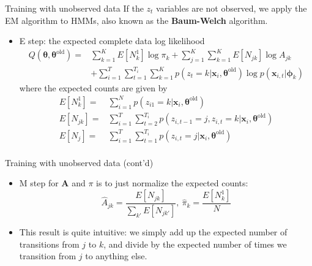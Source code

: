 \documentclass[10pt,mathserif]{beamer}
\begin{document}
\begin{frame}{Training with unobserved data}
If the $z_t$ variables are not observed, we apply the EM algorithm to HMMs, also known as the \textbf{Baum-Welch} algorithm.\bigskip

\begin{itemize}\footnotesize
    \item E step: the expected complete data log likelihood
    \begin{equation*}
        \begin{split}
            Q(\bm{\theta},\bm{\theta}^{\text{old}}) = & \sum_{k=1}^K E[N_k^1] \log\pi_k + \sum_{j=1}^K\sum_{k=1}^K E[N_{jk}]\log A_{jk}\\
            & + \sum_{i=1}^T\sum_{t=1}^{T_i}\sum_{k=1}^K p(z_t = k | \bm{x}_i,\bm{\theta}^{\text{old}})\log p(\bm{x}_{i,t}|\bm{\phi}_k)
        \end{split}
    \end{equation*}
    where the expected counts are given by
    \begin{equation*}
        \begin{split}
            E[N_k^1] = & \sum_{i=1}^N p(z_{i1} = k | \bm{x}_i,\bm{\theta}^{\text{old}})\\
            E[N_{jk}] = & \sum_{i=1}^T\sum_{t=2}^{T_i}p(z_{i,t-1} = j, z_{i,t} = k | \bm{x}_i,\bm{\theta}^{\text{old}})\\
            E[N_j] = & \sum_{i=1}^T\sum_{t=1}^{T_i}p(z_{i,t} = j | \bm{x}_i,\bm{\theta}^{\text{old}})\\
        \end{split}
    \end{equation*}
\end{itemize}
\end{frame}  

\begin{frame}{Training with unobserved data (cont'd)}
\begin{itemize}
    \item M step for $\bm{A}$ and $\pi$ is to just normalize the expected counts:
      \begin{equation*}
          \hat{A}_{jk}  = \frac{E[N_{jk}]}{\sum_{k'}E[N_{jk'}]}, \ \hat{\pi}_k = \frac{E[N_k^1]}{N}
      \end{equation*}
    \item This result is quite intuitive: we simply add up the expected number of transitions from $j$ to $k$, and divide by the expected number of times we transition from $j$ to anything else.
\end{itemize}
\end{frame}
\end{document}
